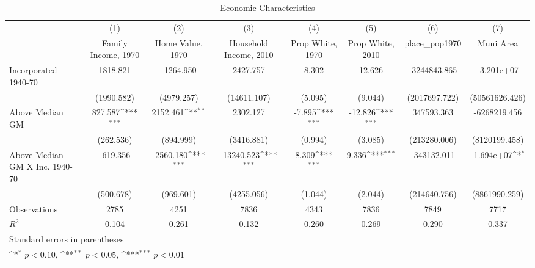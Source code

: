 \begin{table}[htbp]\centering
\def\sym#1{\ifmmode^{#1}\else\(^{#1}\)\fi}
\caption{Economic Characteristics}
\begin{tabular}{l*{7}{c}}
\hline\hline
                    &\multicolumn{1}{c}{(1)}&\multicolumn{1}{c}{(2)}&\multicolumn{1}{c}{(3)}&\multicolumn{1}{c}{(4)}&\multicolumn{1}{c}{(5)}&\multicolumn{1}{c}{(6)}&\multicolumn{1}{c}{(7)}\\
                    &\multicolumn{1}{c}{Family Income, 1970}&\multicolumn{1}{c}{Home Value, 1970}&\multicolumn{1}{c}{Household Income, 2010}&\multicolumn{1}{c}{Prop White, 1970}&\multicolumn{1}{c}{Prop White, 2010}&\multicolumn{1}{c}{place\_pop1970}&\multicolumn{1}{c}{Muni Area}\\
\hline
Incorporated 1940-70&    1818.821         &   -1264.950         &    2427.757         &       8.302         &      12.626         &-3244843.865         &  -3.201e+07         \\
                    &  (1990.582)         &  (4979.257)         & (14611.107)         &     (5.095)         &     (9.044)         &(2017697.722)         &(50561626.426)         \\
[1em]
Above Median GM     &     827.587\sym{***}&    2152.461\sym{**} &    2302.127         &      -7.895\sym{***}&     -12.826\sym{***}&  347593.363         &-6268219.456         \\
                    &   (262.536)         &   (894.999)         &  (3416.881)         &     (0.994)         &     (3.085)         &(213280.006)         &(8120199.458)         \\
[1em]
Above Median GM X Inc. 1940-70&    -619.356         &   -2560.180\sym{***}&  -13240.523\sym{***}&       8.309\sym{***}&       9.336\sym{***}& -343132.011         &  -1.694e+07\sym{*}  \\
                    &   (500.678)         &   (969.601)         &  (4255.056)         &     (1.044)         &     (2.044)         &(214640.756)         &(8861990.259)         \\
\hline
Observations        &        2785         &        4251         &        7836         &        4343         &        7836         &        7849         &        7717         \\
\(R^{2}\)           &       0.104         &       0.261         &       0.132         &       0.260         &       0.269         &       0.290         &       0.337         \\
\hline\hline
\multicolumn{8}{l}{\footnotesize Standard errors in parentheses}\\
\multicolumn{8}{l}{\footnotesize \sym{*} \(p<0.10\), \sym{**} \(p<0.05\), \sym{***} \(p<0.01\)}\\
\end{tabular}
\end{table}
